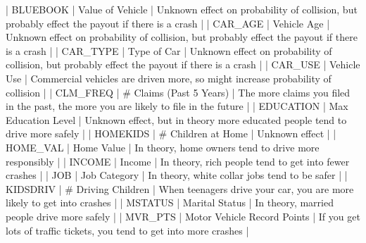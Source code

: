 \documentclass[
]{article}
\newenvironment{Shaded}{\begin{snugshade}}{\end{snugshade}}
\newcommand{\StringTok}[1]{\textcolor[rgb]{0.31,0.60,0.02}{#1}}
\begin{document}
\begin{Shaded}
\begin{Highlighting}[]
\StringTok{| \textasciigrave{}BLUEBOOK\textasciigrave{}       | Value of Vehicle                         | Unknown effect on probability of collision, but probably effect the payout if there is a crash    |}
\StringTok{| \textasciigrave{}CAR\_AGE\textasciigrave{}        | Vehicle Age                              | Unknown effect on probability of collision, but probably effect the payout if there is a crash    |}
\StringTok{| \textasciigrave{}CAR\_TYPE\textasciigrave{}       | Type of Car                              | Unknown effect on probability of collision, but probably effect the payout if there is a crash    |}
\StringTok{| \textasciigrave{}CAR\_USE\textasciigrave{}        | Vehicle Use                              | Commercial vehicles are driven more, so might increase probability of collision                   |}
\StringTok{| \textasciigrave{}CLM\_FREQ\textasciigrave{}       | \# Claims (Past 5 Years)                  | The more claims you filed in the past, the more you are likely to file in the future              |}
\StringTok{| \textasciigrave{}EDUCATION\textasciigrave{}      | Max Education Level                      | Unknown effect, but in theory more educated people tend to drive more safely                      |}
\StringTok{| \textasciigrave{}HOMEKIDS\textasciigrave{}       | \# Children at Home                       | Unknown effect                                                                                    |}
\StringTok{| \textasciigrave{}HOME\_VAL\textasciigrave{}       | Home Value                               | In theory, home owners tend to drive more responsibly                                             |}
\StringTok{| \textasciigrave{}INCOME\textasciigrave{}         | Income                                   | In theory, rich people tend to get into fewer crashes                                             |}
\StringTok{| \textasciigrave{}JOB\textasciigrave{}            | Job Category                             | In theory, white collar jobs tend to be safer                                                     |}
\StringTok{| \textasciigrave{}KIDSDRIV\textasciigrave{}       | \# Driving Children                       | When teenagers drive your car, you are more likely to get into crashes                            |}
\StringTok{| \textasciigrave{}MSTATUS\textasciigrave{}        | Marital Status                           | In theory, married people drive more safely                                                       |}
\StringTok{| \textasciigrave{}MVR\_PTS\textasciigrave{}        | Motor Vehicle Record Points              | If you get lots of traffic tickets, you tend to get into more crashes                             |  }

\end{Highlighting}
\end{Shaded}
\end{document}
